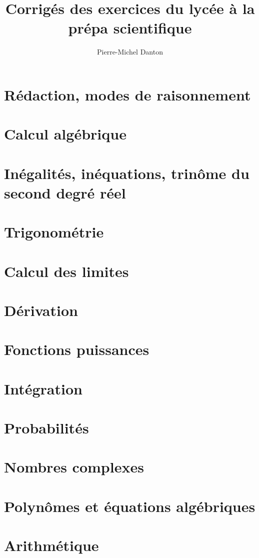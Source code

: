 \documentclass[a4paper,11pt]{article}
\title{Corrigés des exercices du lycée à la prépa scientifique}
\author{Pierre-Michel Danton}
\begin{document}
\maketitle
\tableofcontents

\newpage
\section{Rédaction, modes de raisonnement}


\newpage
\section{Calcul algébrique}


\newpage
\section{Inégalités, inéquations, trinôme du second degré réel}


\newpage
\section{Trigonométrie}


\newpage
\section{Calcul des limites}


\newpage
\section{Dérivation}


\newpage
\section{Fonctions puissances}


\newpage
\section{Intégration}


\newpage
\section{Probabilités}


\newpage
\section{Nombres complexes}


\newpage
\section{Polynômes et équations algébriques}


\newpage
\section{Arithmétique}

\end{document}
